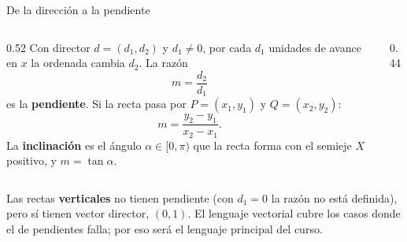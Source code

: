 \documentclass[aspectratio=169,10pt]{beamer}
\newcommand{\destaca}[1]{%
  \par\vspace{3pt}\noindent
  \colorbox{turquesaClaro}{%
    \parbox{\dimexpr\linewidth-2\fboxsep\relax}{\vspace{3pt}#1\vspace{3pt}}}%
  \par\vspace{3pt}}
\begin{document}
\begin{frame}{De la dirección a la pendiente}
  \begin{columns}[T]
    \begin{column}{0.52\textwidth}
      Con director $d=(d_1,d_2)$ y $d_1\neq 0$, por cada $d_1$ unidades
      de avance en $x$ la ordenada cambia $d_2$. La razón
      \[
        m=\frac{d_2}{d_1}
      \]
      es la \textbf{pendiente}. Si la recta pasa por $P=(x_1,y_1)$ y
      $Q=(x_2,y_2)$:
      \[
        m=\frac{y_2-y_1}{x_2-x_1}.
      \]
      La \textbf{inclinación} es el ángulo $\alpha\in[0,\pi)$ que la
      recta forma con el semieje $X$ positivo, y $m=\tan\alpha$.
    \end{column}
    \begin{column}{0.44\textwidth}
      \begin{center}
      \end{center}
    \end{column}
  \end{columns}

  \vspace{0.05cm}
  \destaca{\small Las rectas \textbf{verticales} no tienen pendiente
  (con $d_1=0$ la razón no está definida), pero sí tienen vector
  director, $(0,1)$. El lenguaje vectorial cubre los casos donde el de
  pendientes falla; por eso será el lenguaje principal del curso.}
\end{frame}
\end{document}
